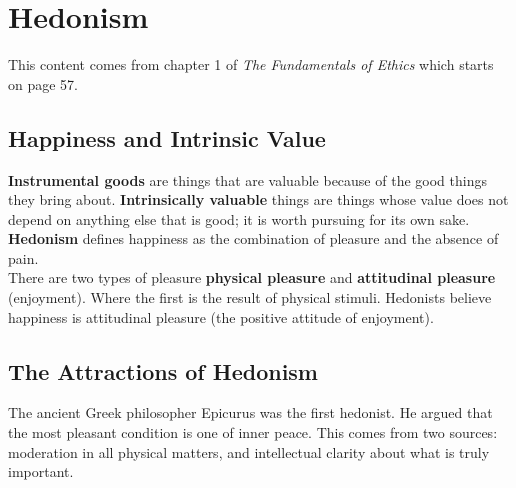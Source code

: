\section{Hedonism}

This content comes from chapter 1 of \textit{The Fundamentals of Ethics} which
starts on page 57.

\subsection{Happiness and Intrinsic Value}

\begin{readingnotes}
	\textbf{Instrumental goods} are things that are valuable because of the good
	things they bring about. \textbf{Intrinsically valuable} things are things whose
	value does not depend on anything else that is good; it is worth pursuing for
	its own sake.\\

	\textbf{Hedonism} defines happiness as the combination of pleasure and the
	absence of pain.\\

	There are two types of pleasure \textbf{physical pleasure} and \textbf{attitudinal pleasure}
	(enjoyment). Where the first is the result of physical stimuli. Hedonists believe
	happiness is attitudinal pleasure (the positive attitude of enjoyment).
\end{readingnotes}

\subsection{The Attractions of Hedonism}

\begin{readingnotes}
	The ancient Greek philosopher Epicurus was the first hedonist. He argued that
	the most pleasant condition is one of inner peace. This comes from two sources:
	moderation in all physical matters, and intellectual clarity about what is truly
	important.
\end{readingnotes}
